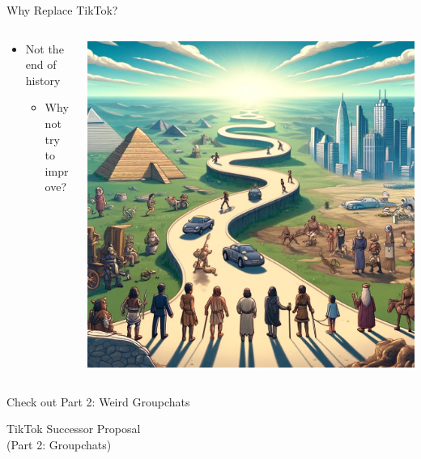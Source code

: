\documentclass[aspectratio=169]{beamer}
\begin{document}
\begin{frame}{Why Replace TikTok?}
\begin{columns}[T]
    \begin{column}[T]{0.5\textwidth}
        \vspace{0.5in}
        \begin{itemize}
            \item Not the end of history
            \begin{itemize}
                \item Why not try to improve?
            \end{itemize}
        \end{itemize}
    \end{column}
    \begin{column}{0.5\textwidth}
        \includegraphics[height=0.8\textheight]{imgs/why_replace/future_path.jpeg}
    \end{column}
\end{columns}
\end{frame}

\begin{frame}{Check out Part 2: Weird Groupchats}
\end{frame}

\begin{frame}
    \centering
    \Huge TikTok Successor Proposal \\
    \Huge (Part 2: Groupchats)
\end{frame}
\end{document}
